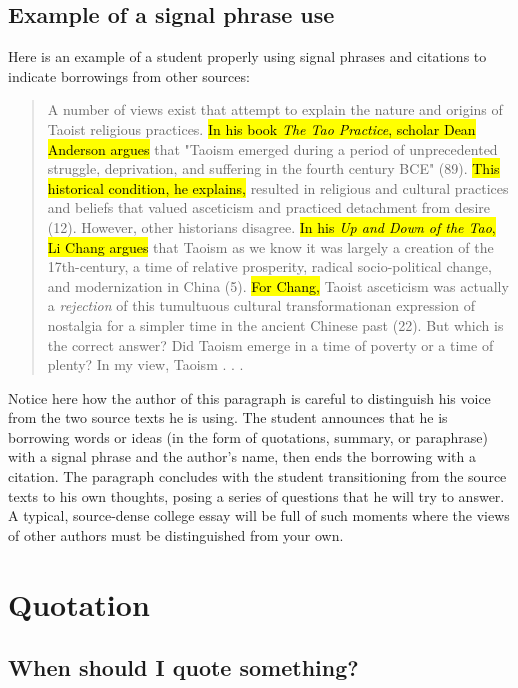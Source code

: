 \subsection{Example of a signal phrase use}

Here is an example of a student properly using signal phrases and citations to indicate borrowings from other sources:

\begin{quote}

A number of views exist that attempt to explain the nature and origins of Taoist religious practices. \hl{In his book \emph{The Tao Practice}, scholar Dean Anderson argues} that "Taoism emerged during a period of unprecedented struggle, deprivation, and suffering in the fourth century BCE" (89). \hl{This historical condition, he explains,} resulted in religious and cultural practices and beliefs that valued asceticism and practiced detachment from desire (12). However, other historians disagree. \hl{In his \emph{Up and Down of the Tao}, Li Chang argues} that Taoism as we know it was largely a creation of the 17th-century, a time of relative prosperity, radical socio-political change, and modernization in China (5). \hl{For Chang,} Taoist asceticism was actually a \emph{rejection} of this tumultuous cultural transformation\textemdash an expression of nostalgia for a simpler time in the ancient Chinese past (22). But which is the correct answer? Did Taoism emerge in a time of poverty or a time of plenty? In my view, Taoism . . .

\end{quote}


\noindent Notice here how the author of this paragraph is careful to distinguish his voice from the two source texts he is using. The student announces that he is borrowing words or ideas (in the form of quotations, summary, or paraphrase) with a signal phrase and the author's name, then ends the borrowing with a citation. The paragraph concludes with the student transitioning from the source texts to his own thoughts, posing a series of questions that he will try to answer. A typical, source-dense college essay will be full of such moments where the views of other authors must be distinguished from your own. 


\hypertarget{quotation}{}
\section{Quotation}

\subsection{When should I quote something?}

